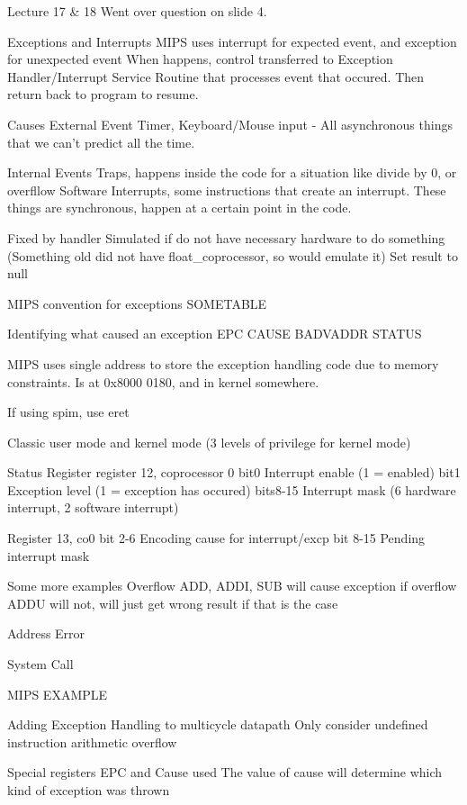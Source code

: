 \documentclass{article}
\begin{document}
Lecture 17 \& 18
	Went over question on slide 4.

	Exceptions and Interrupts
		MIPS uses interrupt for expected event, and exception for unexpected event
		When happens, control transferred to Exception Handler/Interrupt Service Routine that processes event that occured.
		Then return back to program to resume.

		Causes
			External Event
				Timer, Keyboard/Mouse input - All asynchronous things that we can't predict all the time.

			Internal Events
				Traps, happens inside the code for a situation like divide by 0, or overfllow
				Software Interrupts, some instructions that create an interrupt.
				These things are synchronous, happen at a certain point in the code.

				Fixed by handler
				Simulated if do not have necessary hardware to do something (Something old did not have float\_coprocessor, so would emulate it)
				Set result to null

	MIPS convention for exceptions
		SOMETABLE


	Identifying what caused an exception
		EPC
		CAUSE
		BADVADDR
		STATUS

		MIPS uses single address to store the exception handling code due to memory constraints.
		Is at 0x8000 0180, and in kernel somewhere.

		If using spim, use eret

		Classic user mode and kernel mode (3 levels of privilege for kernel mode)

	Status Register
		register 12, coprocessor 0
		bit0	Interrupt enable (1 = enabled)
		bit1	Exception level (1 = exception has occured)
		bits8-15	Interrupt mask (6 hardware interrupt, 2 software interrupt)

		Register 13, co0
		bit 2-6	Encoding cause for interrupt/excp
		bit 8-15	Pending interrupt mask

	Some more examples
		Overflow
			ADD, ADDI, SUB will cause exception if overflow
			ADDU will not, will just get wrong result if that is the case

		Address Error

		System Call

		MIPS EXAMPLE

	Adding Exception Handling to multicycle datapath
		Only consider
			undefined instruction
			arithmetic overflow

		Special registers EPC and Cause used
			The value of cause will determine which kind of exception was thrown
\end{document}
